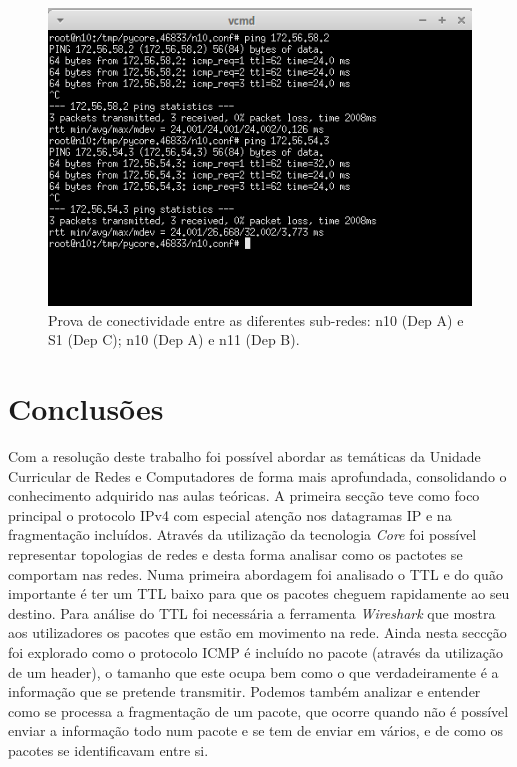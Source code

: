 \documentclass[a4paper]{article}
\begin{document}
\begin{figure}[h]
    \centering
    \includegraphics[scale=1]{parte2/ping-nova-topologia.png}\newline
    \caption{Prova de conectividade entre as diferentes sub-redes: n10 (Dep A) e S1 (Dep C); n10 (Dep A) e n11 (Dep B).}
    \label{fig:my_label}
\end{figure}


\vspace{5cm}

\section{Conclusões}

Com a resolução deste trabalho foi possível abordar as temáticas da Unidade Curricular de Redes e Computadores de forma mais aprofundada, consolidando o conhecimento adquirido nas aulas teóricas. 
 A primeira secção teve como foco principal o protocolo IPv4 com especial atenção  nos datagramas IP e na fragmentação incluídos. Através da utilização da tecnologia \textit{Core} foi possível representar topologias de redes e desta forma analisar como os pactotes se comportam nas redes. Numa primeira abordagem foi analisado o TTL e do quão importante é ter um TTL baixo para que os pacotes cheguem rapidamente ao seu destino. Para análise do TTL foi necessária a ferramenta \textit{Wireshark} que mostra aos utilizadores os pacotes que estão em movimento na rede. Ainda nesta seccção foi explorado como o protocolo ICMP é incluído no pacote (através da utilização de um header), o tamanho que este ocupa bem como o que verdadeiramente é a informação que se pretende transmitir. Podemos também analizar e entender como se processa a fragmentação de um pacote, que ocorre quando não é possível enviar a informação todo num pacote e se tem de enviar em vários, e de como os pacotes se identificavam entre si.\newpage
 
\end{document}
